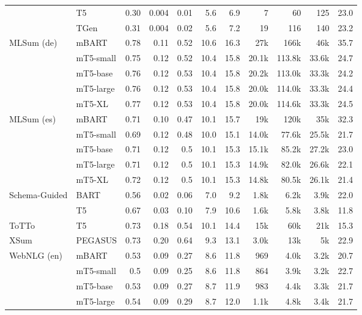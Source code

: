 \documentclass[11pt,a4paper]{article}
\begin{document}
\begin{table*}[!htbp]
\begin{tabular}{@{}llrrrrrrrrr@{}}
 & \small{T5} & 0.30 & 0.004 & 0.01 & 5.6 & 6.9 & 7 & 60 & 125 & 23.0 \\
 & \small{TGen} & 0.31 & 0.004 & 0.02 & 5.6 & 7.2 & 19 & 116 & 140 & 23.2 \\
\midrule
\small{MLSum (de)} & \small{mBART} & 0.78 & 0.11 & 0.52 & 10.6 & 16.3 & 27k & 166k & 46k & 35.7 \\
 & \small{mT5-small} & 0.75 & 0.12 & 0.52 & 10.4 & 15.8 & 20.1k & 113.8k & 33.6k & 24.7 \\
 & \small{mT5-base} & 0.76 & 0.12 & 0.53 & 10.4 & 15.8 & 20.2k & 113.0k & 33.3k & 24.2 \\
 & \small{mT5-large} & 0.76 & 0.12 & 0.53 & 10.4 & 15.8 & 20.0k & 114.0k & 33.3k & 24.4 \\
 & \small{mT5-XL} & 0.77 & 0.12 & 0.53 & 10.4 & 15.8 & 20.0k & 114.6k & 33.3k & 24.5 \\
\small{MLSum (es)} & \small{mBART} & 0.71 & 0.10 & 0.47 & 10.1 & 15.7 & 19k & 120k & 35k & 32.3 \\
 & \small{mT5-small} & 0.69 & 0.12 & 0.48 & 10.0 & 15.1 & 14.0k & 77.6k & 25.5k & 21.7 \\
 & \small{mT5-base} & 0.71 & 0.12 & 0.5 & 10.1 & 15.3 & 15.1k & 85.2k & 27.2k & 23.0 \\
 & \small{mT5-large} & 0.71 & 0.12 & 0.5 & 10.1 & 15.3 & 14.9k & 82.0k & 26.6k & 22.1 \\
 & \small{mT5-XL} & 0.72 & 0.12 & 0.5 & 10.1 & 15.3 & 14.8k & 80.5k & 26.1k & 21.4 \\
\midrule
\multirow{2}{*}{Schema-Guided} & \small{BART} & 0.56 & 0.02 & 0.06 & 7.0 & 9.2 & 1.8k & 6.2k & 3.9k & 22.0 \\
& \small{T5}  & 0.67 & 0.03 & 0.10 & 7.9 & 10.6 & 1.6k & 5.8k & 3.8k & 11.8 \\
\midrule
\small{ToTTo} & \small{T5} & 0.73 & 0.18 & 0.54 & 10.1 & 14.4 & 15k & 60k & 21k & 15.3 \\
\midrule
\small{XSum} & \small{PEGASUS} & 0.73 & 0.20 & 0.64 & 9.3 & 13.1 & 3.0k & 13k & 5k & 22.9 \\
\midrule
\small{WebNLG (en)} & \small{mBART} & 0.53 & 0.09 & 0.27 & 8.6 & 11.8 & 969 & 4.0k & 3.2k & 20.7 \\
 & \small{mT5-small} & 0.5 & 0.09 & 0.25 & 8.6 & 11.8 & 864 & 3.9k & 3.2k & 22.7 \\
 & \small{mT5-base} & 0.53 & 0.09 & 0.27 & 8.7 & 11.9 & 983 & 4.4k & 3.3k & 21.7 \\
 & \small{mT5-large} & 0.54 & 0.09 & 0.29 & 8.7 & 12.0 & 1.1k & 4.8k & 3.4k & 21.7 \\

\end{tabular}
\end{table*}
\end{document}
